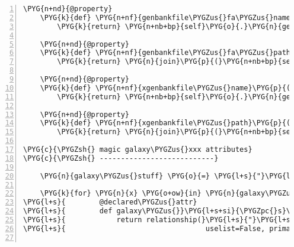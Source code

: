 \begin{Verbatim}[commandchars=\\\{\},numbers=left,firstnumber=1,stepnumber=5]
    \PYG{n+nd}{@property}
    \PYG{k}{def} \PYG{n+nf}{genbankfile\PYGZus{}fa\PYGZus{}name}\PYG{p}{(}\PYG{n+nb+bp}{self}\PYG{p}{)}\PYG{p}{:}
        \PYG{k}{return} \PYG{n+nb+bp}{self}\PYG{o}{.}\PYG{n}{genbankfile\PYGZus{}base\PYGZus{}name} \PYG{o}{+} \PYG{l+s}{"}\PYG{l+s}{.fa}\PYG{l+s}{"}

    \PYG{n+nd}{@property}
    \PYG{k}{def} \PYG{n+nf}{genbankfile\PYGZus{}fa\PYGZus{}path}\PYG{p}{(}\PYG{n+nb+bp}{self}\PYG{p}{)}\PYG{p}{:}
        \PYG{k}{return} \PYG{n}{join}\PYG{p}{(}\PYG{n+nb+bp}{self}\PYG{o}{.}\PYG{n}{genbank\PYGZus{}data\PYGZus{}dir}\PYG{p}{,} \PYG{n+nb+bp}{self}\PYG{o}{.}\PYG{n}{genbankfile\PYGZus{}fa\PYGZus{}name}\PYG{p}{)}

    \PYG{n+nd}{@property}
    \PYG{k}{def} \PYG{n+nf}{xgenbankfile\PYGZus{}name}\PYG{p}{(}\PYG{n+nb+bp}{self}\PYG{p}{)}\PYG{p}{:}
        \PYG{k}{return} \PYG{n+nb+bp}{self}\PYG{o}{.}\PYG{n}{genbankfile\PYGZus{}base\PYGZus{}name} \PYG{o}{+} \PYG{l+s}{"}\PYG{l+s}{.augmented.gb}\PYG{l+s}{"}

    \PYG{n+nd}{@property}
    \PYG{k}{def} \PYG{n+nf}{xgenbankfile\PYGZus{}path}\PYG{p}{(}\PYG{n+nb+bp}{self}\PYG{p}{)}\PYG{p}{:}
        \PYG{k}{return} \PYG{n}{join}\PYG{p}{(}\PYG{n+nb+bp}{self}\PYG{o}{.}\PYG{n}{data\PYGZus{}dir}\PYG{p}{,} \PYG{n+nb+bp}{self}\PYG{o}{.}\PYG{n}{xgenbankfile\PYGZus{}name}\PYG{p}{)}

\PYG{c}{\PYGZsh{} magic galaxy\PYGZus{}xxx attributes}
\PYG{c}{\PYGZsh{} ---------------------------}

    \PYG{n}{galaxy\PYGZus{}stuff} \PYG{o}{=} \PYG{l+s}{"}\PYG{l+s}{hg\PYGZus{}text bam coverage hp\PYGZus{}terms pr\PYGZus{}operons}\PYG{l+s}{"}\PYG{o}{.}\PYG{n}{split}\PYG{p}{(}\PYG{p}{)}

    \PYG{k}{for} \PYG{n}{x} \PYG{o+ow}{in} \PYG{n}{galaxy\PYGZus{}stuff}\PYG{p}{:} \PYG{k}{exec} \PYG{l+s}{"""}\PYG{l+s}{if True: \PYGZsh{} just to enable indentation ...}
\PYG{l+s}{        @declared\PYGZus{}attr}
\PYG{l+s}{        def galaxy\PYGZus{}}\PYG{l+s+si}{\PYGZpc{}s}\PYG{l+s}{(self):}
\PYG{l+s}{            return relationship(}\PYG{l+s}{"}\PYG{l+s}{GalaxyDataset}\PYG{l+s}{"}\PYG{l+s}{,}
\PYG{l+s}{                                 uselist=False, primaryjoin=}\PYG{l+s}{"}\PYG{l+s+si}{\PYGZpc{}s}\PYG{l+s}{"}\PYG{l+s}{)}\PYG{l+s}{"""} \PYG{o}{\PYGZpc{}} \PYG{p}{(}\PYG{n}{x}\PYG{p}{,}


\end{Verbatim}
